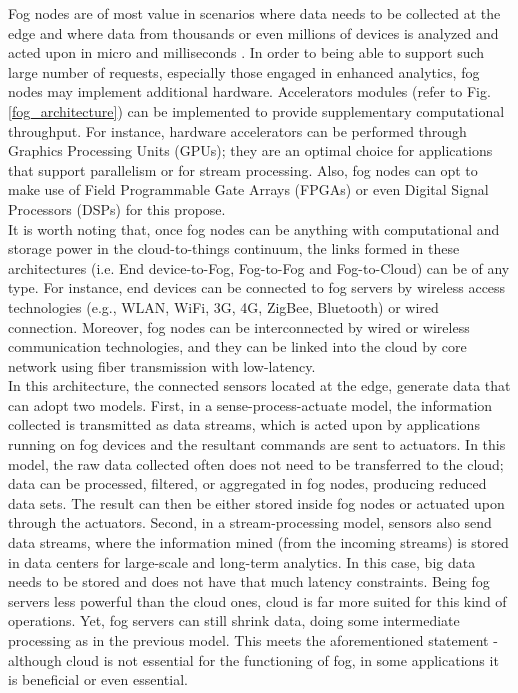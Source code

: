 \noindent\tab Fog nodes are of most value in scenarios where data needs to be collected at the edge and where data from thousands or even millions of devices is analyzed and acted upon in micro and milliseconds \cite{openfog2017openfog}. In order to being able to support such large number of requests, especially those engaged in enhanced analytics, fog nodes may implement additional hardware. Accelerators modules (refer to Fig. \ref{fog_architecture}) can be implemented to provide supplementary computational throughput. For instance, hardware accelerators can be performed through Graphics Processing Units (GPUs); they are an optimal choice for applications that support parallelism or for stream processing. Also, fog nodes can opt to make use of Field Programmable Gate Arrays (FPGAs) or even Digital Signal Processors (DSPs) for this propose.\\
\noindent\tab It is worth noting that, once fog nodes can be anything with computational and storage power in the cloud-to-things continuum, the links formed in these architectures (i.e. End device-to-Fog, Fog-to-Fog and Fog-to-Cloud) can be of any type. For instance, end devices can be connected to fog servers by wireless access technologies (e.g., WLAN, WiFi, 3G, 4G, ZigBee, Bluetooth) or wired connection. Moreover, fog nodes can be interconnected by wired or wireless communication technologies, and they can be linked into the cloud by core network using fiber transmission with low-latency.\\
\noindent\tab In this architecture, the connected sensors located at the edge, generate data that can adopt two models. First, in a sense-process-actuate model, the information collected is transmitted as data streams, which is acted upon by applications running on fog devices and the resultant commands are sent to actuators. In this model, the raw data collected often does not need to be transferred to the cloud; data can be processed, filtered, or aggregated in fog nodes, producing reduced data sets. The result can then be either stored inside fog nodes or actuated upon through the actuators. Second, in a stream-processing model, sensors also send data streams, where the information mined (from the incoming streams) is stored in data centers for large-scale and long-term analytics. In this case, big data needs to be stored and does not have that much latency constraints. Being fog servers less powerful than the cloud ones, cloud is far more suited for this kind of operations. Yet, fog servers can still shrink data, doing some intermediate processing as in the previous model. This meets the aforementioned statement - although cloud is not essential for the functioning of fog, in some applications it is beneficial or even essential.\\
